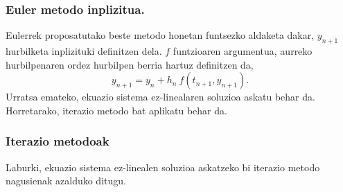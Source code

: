 \subsubsection*{Euler metodo inplizitua.}

Eulerrek proposatutako beste metodo honetan funtsezko aldaketa dakar,  $y_{n+1}$ hurbilketa inplizituki definitzen dela. $f$ funtzioaren argumentua, aurreko hurbilpenaren ordez hurbilpen berria hartuz definitzen da,
\begin{equation*}
 \label{eq:202b}
y_{n+1}=y_{n}+h_n \ f(t_{n+1},y_{n+1}).
\end{equation*}
Urratsa emateko, ekuazio sistema ez-linealaren soluzioa askatu behar da. Horretarako, iterazio metodo bat aplikatu behar da.

\subsubsection*{Iterazio metodoak}

Laburki, ekuazio sistema ez-linealen soluzioa askatzeko bi iterazio metodo nagusienak azalduko ditugu.

